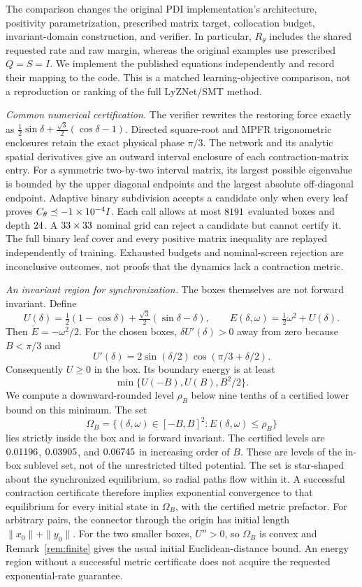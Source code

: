 \documentclass[12pt,onecolumn,journal]{IEEEtran}
\begin{document}
The comparison changes the original PDI implementation's architecture, positivity parametrization, prescribed matrix target, collocation budget, invariant-domain construction, and verifier. In particular, $R_\theta$ includes the shared requested rate and raw margin, whereas the original examples use prescribed $Q=S=I$. We implement the published equations independently and record their mapping to the code. This is a matched learning-objective comparison, not a reproduction or ranking of the full LyZNet/SMT method.

\noindent\textit{Common numerical certification.}
The verifier rewrites the restoring force exactly as
$\tfrac12\sin\delta+\tfrac{\sqrt3}{2}(\cos\delta-1)$.
Directed square-root and MPFR trigonometric enclosures retain the exact physical phase $\pi/3$. The network and its analytic spatial derivatives give an outward interval enclosure of each contraction-matrix entry. For a symmetric two-by-two interval matrix, its largest possible eigenvalue is bounded by the upper diagonal endpoints and the largest absolute off-diagonal endpoint. Adaptive binary subdivision accepts a candidate only when every leaf proves $C_\theta\preceq-1 \times 10^{-4} I$. Each call allows at most $8191$ evaluated boxes and depth $24$. A $33\times33$ nominal grid can reject a candidate but cannot certify it. The full binary leaf cover and every positive matrix inequality are replayed independently of training. Exhausted budgets and nominal-screen rejection are inconclusive outcomes, not proofs that the dynamics lack a contraction metric.

\noindent\textit{An invariant region for synchronization.}
The boxes themselves are not forward invariant. Define
\[
U(\delta)=\tfrac12(1-\cos\delta)+\tfrac{\sqrt3}{2}(\sin\delta-\delta),
\qquad E(\delta,\omega)=\tfrac12\omega^2+U(\delta).
\]
Then $\dot E=-\omega^2/2$. For the chosen boxes, $\delta U'(\delta)>0$ away from zero because $B<\pi/3$ and
\[
U'(\delta)=2\sin(\delta/2)\cos(\pi/3+\delta/2).
\]
Consequently $U\ge0$ in the box. Its boundary energy is at least
\[
\min\{U(-B),U(B),B^2/2\}.
\]
We compute a downward-rounded level $\rho_B$ below nine tenths of a certified lower bound on this minimum. The set
\[
\Omega_B=\{(\delta,\omega)\in[-B,B]^2:E(\delta,\omega)\le\rho_B\}
\]
lies strictly inside the box and is forward invariant. The certified levels are $0.01196$, $0.03905$, and $0.06745$ in increasing order of $B$. These are levels of the in-box sublevel set, not of the unrestricted tilted potential. The set is star-shaped about the synchronized equilibrium, so radial paths flow within it. A successful contraction certificate therefore implies exponential convergence to that equilibrium for every initial state in $\Omega_B$, with the certified metric prefactor. For arbitrary pairs, the connector through the origin has initial length $\|x_0\|+\|y_0\|$. For the two smaller boxes, $U''>0$, so $\Omega_B$ is convex and Remark~\ref{rem:finite} gives the usual initial Euclidean-distance bound. An energy region without a successful metric certificate does not acquire the requested exponential-rate guarantee.
\end{document}
